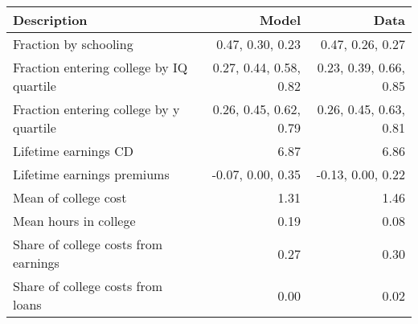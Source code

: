 \begin{tabular}{lrr}
\hline
Description & Model  & Data  \\ 
\hline
Fraction by schooling & 0.47, 0.30, 0.23  & 0.47, 0.26, 0.27  \\ 
Fraction entering college by IQ quartile & 0.27, 0.44, 0.58, 0.82  & 0.23, 0.39, 0.66, 0.85  \\ 
Fraction entering college by y quartile & 0.26, 0.45, 0.62, 0.79  & 0.26, 0.45, 0.63, 0.81  \\ 
Lifetime earnings CD & 6.87  & 6.86  \\ 
Lifetime earnings premiums & -0.07, 0.00, 0.35  & -0.13, 0.00, 0.22  \\ 
Mean of college cost & 1.31  & 1.46  \\ 
Mean hours in college & 0.19  & 0.08  \\ 
Share of college costs from earnings & 0.27  & 0.30  \\ 
Share of college costs from loans & 0.00  & 0.02  \\ 
\hline
\end{tabular}%
